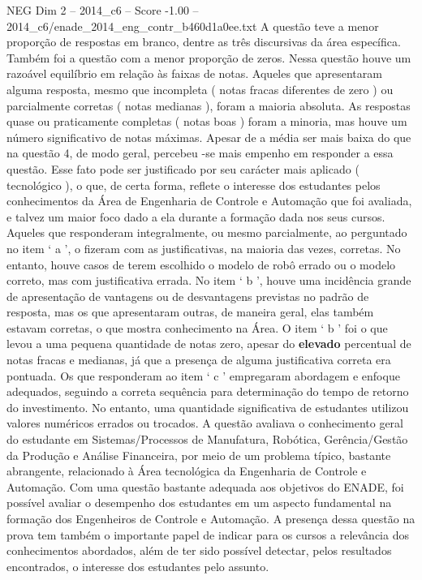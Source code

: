 \begin{textsample}{NEG Dim 2 – 2014\_c6 – Score -1.00 – 2014\_c6/enade\_2014\_eng\_contr\_b460d1a0ee.txt}
A questão teve a menor proporção de respostas em branco, dentre as três discursivas da área específica.
Também foi a questão com a menor proporção de zeros.
Nessa questão houve um razoável equilíbrio em relação às faixas de notas.
Aqueles que apresentaram alguma resposta, mesmo que incompleta ( notas fracas diferentes de zero ) ou parcialmente corretas ( notas medianas ), foram a maioria absoluta.
As respostas quase ou praticamente completas ( notas boas ) foram a minoria, mas houve um número significativo de notas máximas.
Apesar de a média ser mais baixa do que na questão 4, de modo geral, percebeu -se mais empenho em responder a essa questão.
Esse fato pode ser justificado por seu carácter mais aplicado ( tecnológico ), o que, de certa forma, reflete o interesse dos estudantes pelos conhecimentos da Área de Engenharia de Controle e Automação que foi avaliada, e talvez um maior foco dado a ela durante a formação dada nos seus cursos.
Aqueles que responderam integralmente, ou mesmo parcialmente, ao perguntado no item ‘ a ’, o fizeram com as justificativas, na maioria das vezes, corretas.
No entanto, houve casos de terem escolhido o modelo de robô errado ou o modelo correto, mas com justificativa errada.
No item ‘ b ’, houve uma incidência grande de apresentação de vantagens ou de desvantagens previstas no padrão de resposta, mas os que apresentaram outras, de maneira geral, elas também estavam corretas, o que mostra conhecimento na Área.
O item ‘ b ’ foi o que levou a uma pequena quantidade de notas zero, apesar do \textbf{elevado} percentual de notas fracas e medianas, já que a presença de alguma justificativa correta era pontuada.
Os que responderam ao item ‘ c ’ empregaram abordagem e enfoque adequados, seguindo a correta sequência para determinação do tempo de retorno do investimento.
No entanto, uma quantidade significativa de estudantes utilizou valores numéricos errados ou trocados.
A questão avaliava o conhecimento geral do estudante em Sistemas/Processos de Manufatura, Robótica, Gerência/Gestão da Produção e Análise Financeira, por meio de um problema típico, bastante abrangente, relacionado à Área tecnológica da Engenharia de Controle e Automação.
Com uma questão bastante adequada aos objetivos do ENADE, foi possível avaliar o desempenho dos estudantes em um aspecto fundamental na formação dos Engenheiros de Controle e Automação.
A presença dessa questão na prova tem também o importante papel de indicar para os cursos a relevância dos conhecimentos abordados, além de ter sido possível detectar, pelos resultados encontrados, o interesse dos estudantes pelo assunto.

\end{textsample}
